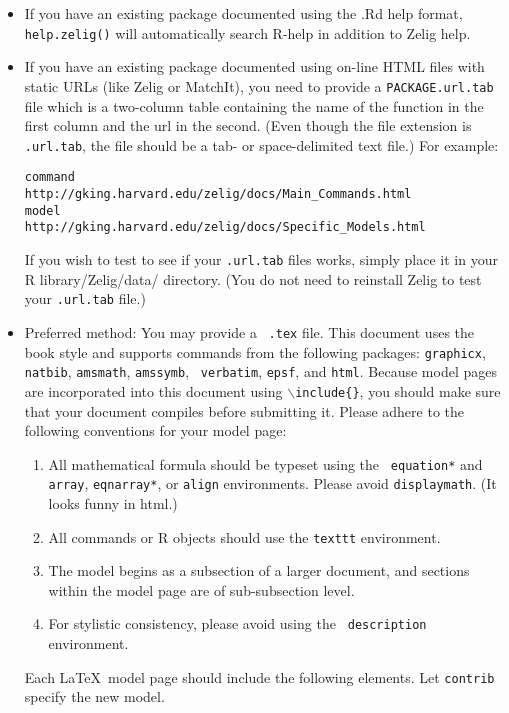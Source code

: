 \begin{itemize}
\item If you have an existing package documented using the .Rd help
  format, {\tt help.zelig()} will automatically search R-help in
  addition to Zelig help.
\item If you have an existing package documented using on-line HTML
  files with static URLs (like Zelig or MatchIt), you need to provide
  a {\tt PACKAGE.url.tab} file which is a two-column table containing
  the name of the function in the first column and the url in the
  second.  (Even though the file extension is {\tt .url.tab}, the file
  should be a tab- or space-delimited text file.)  For example:  
\begin{verbatim}
command       http://gking.harvard.edu/zelig/docs/Main_Commands.html
model         http://gking.harvard.edu/zelig/docs/Specific_Models.html
\end{verbatim}
If you wish to test to see if your {\tt .url.tab} files works, simply
place it in your R library/Zelig/data/ directory.  (You do not need to
reinstall Zelig to test your {\tt .url.tab} file.)
\item Preferred method:  You may provide a \LaTeXe\ {\tt .tex} file.  This document uses
  the book style and supports commands from the following packages:
  {\tt graphicx}, {\tt natbib}, {\tt amsmath}, {\tt amssymb}, {\tt
    verbatim}, {\tt epsf}, and {\tt html}.  Because model pages are
  incorporated into this document using {\tt $\backslash$include\{\}},
  you should make sure that your document compiles before submitting
  it.  Please adhere to the following conventions for your model page: 
  \begin{enumerate}
  \item All mathematical formula should be typeset using the {\tt
      equation*} and {\tt array}, {\tt eqnarray*}, or {\tt align}
    environments.  Please avoid {\tt displaymath}.  (It looks funny in
    html.)
  \item All commands or R objects should use the {\tt texttt}
    environment.
  \item The model begins as a subsection of a larger document, and
    sections within the model page are of sub-subsection level.
\item For stylistic consistency, please avoid using the {\tt
    description} environment.
\end{enumerate}

Each \LaTeX\ model page should include the following elements.  Let
{\tt contrib} specify the new model.


\end{itemize}
